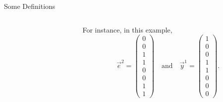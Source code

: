 \documentclass[../240906_cryptlab_flute.tex]{subfiles}
\begin{document}
\begin{frame}{Some Definitions}
\begin{columns}
\begin{column}{.5\textwidth}
        \end{column}
        \begin{column}{.5\textwidth}
            For instance, in this example,
            \[
                \vec{e}^2 = \begin{pmatrix} 0 \\ 0 \\ 1 \\ 1 \\ 0 \\ 0 \\ 1 \\ 1 \end{pmatrix}
                \quad\text{and}\quad
                \vec{y}^1 = \begin{pmatrix} 1 \\ 0 \\ 0 \\ 1 \\ 1 \\ 0 \\ 0 \\ 0 \end{pmatrix}.
            \]
        \end{column}
    \end{columns}
\end{frame}
\end{document}
